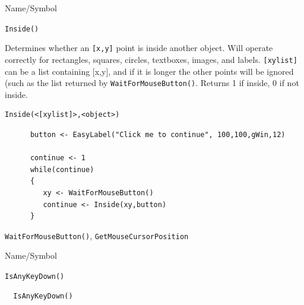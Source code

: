 \begin{desc}{Name/Symbol}
\item[Name/Symbol]	\verb+Inside()+

\item[Description] Determines whether an \verb+[x,y]+ point is inside another
  object.  Will operate correctly for rectangles, squares, circles,
  textboxes, images, and labels. \verb+[xylist]+ can be a list containing
  [x,y], and if it is longer the other points will be ignored (such as
  the list returned by \verb+WaitForMouseButton()+.  Returns 1 if inside, 0
  if not inside.

\item[Usage]
\begin{verbatim}
Inside(<[xylist]>,<object>)	
\end{verbatim}

\item[Example]	

\begin{verbatim}
      button <- EasyLabel("Click me to continue", 100,100,gWin,12)

      continue <- 1
      while(continue)
      {
         xy <- WaitForMouseButton()
         continue <- Inside(xy,button)
      }
\end{verbatim}

\item[See Also]	
\verb+WaitForMouseButton()+, \verb+GetMouseCursorPosition+

\end{desc}

\begin{desc}{Name/Symbol}
\item[Name/Symbol]	\verb+IsAnyKeyDown()+

\item[Description]	

\item[Usage]		
\begin{verbatim}
  IsAnyKeyDown()
\end{verbatim}

\item[Example]	

\item[See Also]	
\end{desc}

